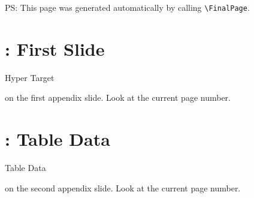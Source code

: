 \documentclass[11pt,a4paper,landscape]{article}
\begin{document}
\FinalPage
\vfill 
\centerline{\footnotesize PS: This page was generated automatically by calling
\texttt{\textbackslash FinalPage}.} 
\vfill


\NewPage



\appendix
\NewPage\section*{\appendixname: First Slide}
\vfill
\hypertarget{anchorname}{Hyper Target} on the first appendix slide. 
Look at the current page number.
\vfill

\NewPage\section*{\appendixname: Table Data}
\vfill
\hypertarget{table_data}{Table Data} on the second appendix slide.
Look at the current page number.
\vfill
\end{document}
